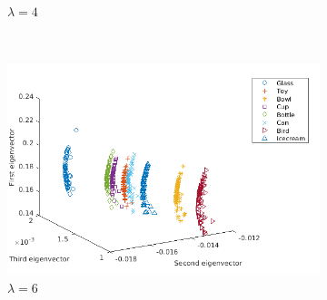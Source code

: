 \documentclass[10pt,a4paper]{article}
\begin{document}
\begin{figure}[H]
\begin{subfigure}[b]{0.5\textwidth}
		\caption{$\lambda=4$}
		\label{}
	\end{subfigure}~
	\begin{subfigure}[b]{0.5\textwidth}
		\includegraphics[width= \textwidth]{images/Zeta-Laplace6.png}
		\caption{$\lambda=6$}
		\label{}
	\end{subfigure}
	\caption{ }
	\label{}
\end{figure}

\newpage
\renewcommand{\bibname}{References}
\nocite{*}


\end{document}
